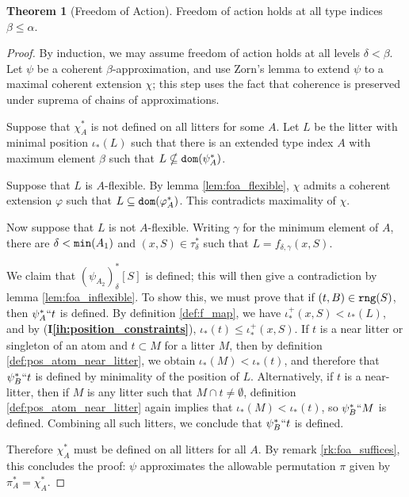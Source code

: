 \documentclass[112pt]{article}
\theoremstyle{definition}
\newtheorem{theorem}{Theorem}[section]
\theoremstyle{remark}
\newcommand{\ihref}[1]{(\textbf{I\ref{#1}})}
\newcommand{\suggest}[1]{{\color{red} #1}}
\newcommand{\hsuggest}[1]{{\color{magenta}#1}}
\begin{document}
\begin{theorem}[Freedom of Action]\label{thm:foa}
  Freedom of action holds at all type indices $\beta \leq \alpha$.
\end{theorem}
\begin{proof}
  By induction, we may assume freedom of action holds at all levels $\delta < \beta$.
  Let $\psi$ be a coherent $\beta$-approximation, and use Zorn's lemma to extend $\psi$ to a maximal coherent extension $\chi$; this step uses the fact that coherence is preserved under suprema of chains of approximations.

  Suppose that $\chi_A^*$ is not defined on all litters for some $A$.
  Let $L$ be the litter with minimal position $\iota_*(L)$ such that there is %
  {an extended type index $A$}
  with maximum element $\beta$ such that $L \nsubseteq {\tt dom}(\psi_A^*)$.

  Suppose that $L$ is $A$-flexible.
  By lemma \ref{lem:foa_flexible}, $\chi$ admits a coherent extension $\varphi$ such that $L \subseteq {\tt dom}(\varphi_A^*)$.
  This contradicts maximality of $\chi$.

  Now suppose that $L$ is not $A$-flexible.
  Writing $\gamma$ for the minimum element of $A$, there are $\delta < {\tt min}(A_1)$ and $(x, S) \in \tau_\delta^*$ such that $L = f_{\delta,\gamma}(x, S)$.


  We claim that $(\psi_{A_2})_\delta^*[S]$ is defined; this will then give a contradiction by lemma \ref{lem:foa_inflexible}.
  To show this, we must prove that if $(t, B) \in {\tt rng}(S)$, then $\psi_A^*``t$ is defined.
  By definition \ref{def:f_map}, we have $\iota_*^+(x, S) < \iota_*(L)$, and by \ihref{ih:position_constraints}, $\iota_*(t) \leq \iota_*^+(x, S)$.
  If $t$ is a near litter or singleton of an atom and $t \subset M$ for a litter $M$, then by definition \ref{def:pos_atom_near_litter}, we obtain $\iota_*(M) < \iota_*(t)$, and therefore that $\psi_B^*``t$ is defined by minimality of the position of $L$.%
  Alternatively, if $t$ is a near-litter, then if $M$ is any litter such that $M \cap t \neq \emptyset$, definition \ref{def:pos_atom_near_litter} again implies that $\iota_*(M) < \iota_*(t)$, so $\psi_B^*``M$ is defined.
  Combining all such litters, we conclude that $\psi_B^*``t$ is defined.

  Therefore $\chi_A^*$ must be defined on all litters for all $A$.
  By remark \ref{rk:foa_suffices}, this concludes the proof: $\psi$ approximates the allowable permutation $\pi$ given by $\pi_A^* = \chi_A^*$.
\end{proof}
\end{document}
